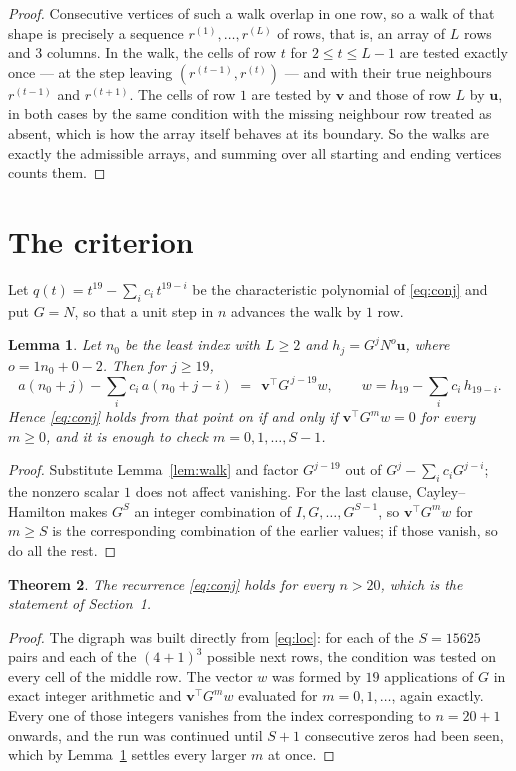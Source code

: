 \documentclass[11pt,a4paper]{article}
\theoremstyle{plain}
\newtheorem{theorem}{Theorem}
\newtheorem{lemma}[theorem]{Lemma}
\theoremstyle{definition}
\begin{document}
\begin{proof}
Consecutive vertices of such a walk overlap in one row, so a walk of that shape is
precisely a sequence $r^{(1)},\dots,r^{(L)}$ of rows, that is, an array of $L$ rows
and $3$ columns. In the walk, the cells of row $t$ for $2\le t\le L-1$ are tested
exactly once --- at the step leaving $(r^{(t-1)},r^{(t)})$ --- and with their true
neighbours $r^{(t-1)}$ and $r^{(t+1)}$. The cells of row $1$ are tested by
$\mathbf{v}$ and those of row $L$ by $\mathbf{u}$, in both cases by the same condition
with the missing neighbour row treated as absent, which is how the array itself behaves at
its boundary. So the walks are exactly the admissible arrays, and summing over all starting
and ending vertices counts them.
\end{proof}

\section{The criterion}

Let $q(t)=t^{19}-\sum_i c_i\,t^{19-i}$ be the characteristic polynomial of
\eqref{eq:conj} and put $G=N$, so that a unit step in $n$ advances the walk by
$1$ row.

\begin{lemma}\label{lem:crit}
Let $n_0$ be the least index with $L\ge2$ and $h_j=G^{j}N^{o}\mathbf{u}$, where
$o=1n_0+0-2$. Then for $j\ge19$,
\[
a(n_0+j)-\sum_i c_i\,a(n_0+j-i)\;=\;\,\mathbf{v}^{\!\top}G^{\,j-19}w,
\qquad w=h_{19}-\sum_i c_i\,h_{19-i} .
\]
Hence \eqref{eq:conj} holds from that point on if and only if
$\mathbf{v}^{\!\top}G^{m}w=0$ for every $m\ge0$, and it is enough to check
$m=0,1,\dots,S-1$.
\end{lemma}

\begin{proof}
Substitute Lemma~\ref{lem:walk} and factor $G^{j-19}$ out of
$G^{j}-\sum_ic_iG^{j-i}$; the nonzero scalar $1$ does not affect
vanishing. For the last clause, Cayley--Hamilton makes $G^{S}$ an integer combination of
$I,G,\dots,G^{S-1}$, so $\mathbf{v}^{\!\top}G^{m}w$ for $m\ge S$ is the corresponding
combination of the earlier values; if those vanish, so do all the rest.
\end{proof}

\begin{theorem}
The recurrence \eqref{eq:conj} holds for every $n>20$, which is the statement of
Section~1.
\end{theorem}

\begin{proof}
The digraph was built directly from \eqref{eq:loc}: for each of the $S=15625$ pairs and each
of the $(4+1)^{3}$ possible next rows, the condition was tested on every cell of
the middle row. The vector $w$ was formed by $19$ applications of $G$ in exact integer
arithmetic and $\mathbf{v}^{\!\top}G^{m}w$ evaluated for $m=0,1,\dots$, again exactly.
Every one of those integers vanishes from the index corresponding to $n=20+1$ onwards,
and the run was continued until $S+1$ consecutive zeros had been seen, which by
Lemma~\ref{lem:crit} settles every larger $m$ at once.
\end{proof}
\end{document}
